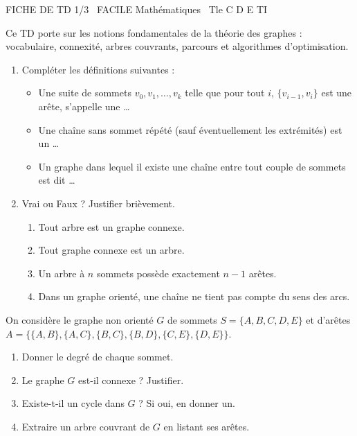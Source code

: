 \documentclass[11pt]{article}
\begin{document}
\begin{tcolorbox}[enhanced,colback=popink,colframe=popink,arc=10pt,boxrule=0pt,left=12pt,right=12pt,top=9pt,bottom=9pt]
{\color{white}\popxbold\small FICHE DE TD 1/3 \textbullet\ FACILE \hfill Mathématiques \textbullet\ Tle C D E TI\par}
\end{tcolorbox}
\vspace{4pt}
Ce TD porte sur les notions fondamentales de la théorie des graphes : vocabulaire, connexité, arbres couvrants, parcours et algorithmes d'optimisation.

\begin{exercice}
\begin{enumerate}
    \item Compléter les définitions suivantes :
    \begin{itemize}
        \item Une suite de sommets $v_0, v_1, \dots, v_k$ telle que pour tout $i$, $\{v_{i-1}, v_i\}$ est une arête, s'appelle une \dots
        \item Une chaîne sans sommet répété (sauf éventuellement les extrémités) est un \dots
        \item Un graphe dans lequel il existe une chaîne entre tout couple de sommets est dit \dots
    \end{itemize}
    \item Vrai ou Faux ? Justifier brièvement.
    \begin{enumerate}
        \item Tout arbre est un graphe connexe.
        \item Tout graphe connexe est un arbre.
        \item Un arbre à $n$ sommets possède exactement $n-1$ arêtes.
        \item Dans un graphe orienté, une chaîne ne tient pas compte du sens des arcs.
    \end{enumerate}
\end{enumerate}
\end{exercice}

\begin{exercice}
On considère le graphe non orienté $G$ de sommets $S = \{A, B, C, D, E\}$ et d'arêtes $A = \{\{A,B\}, \{A,C\}, \{B,C\}, \{B,D\}, \{C,E\}, \{D,E\}\}$.
\begin{enumerate}
    \item Donner le degré de chaque sommet.
    \item Le graphe $G$ est-il connexe ? Justifier.
    \item Existe-t-il un cycle dans $G$ ? Si oui, en donner un.
    \item Extraire un arbre couvrant de $G$ en listant ses arêtes.
\end{enumerate}
\end{exercice}
\end{document}
